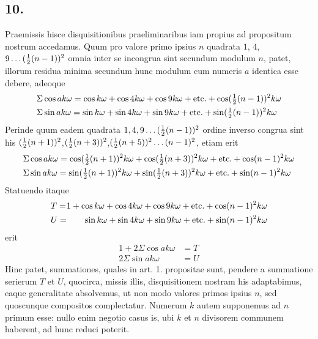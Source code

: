 \documentclass[twoside,12pt, showframe]{memoir}
\let\oldfrac\frac
\def\frac#1#2{\mathchoice{\tfrac{#1}{#2}}{\oldfrac{#1}{#2}}{\genfrac{}{}{}{2}{#1}{#2\mathstrut}}{\genfrac{}{}{}{3}{#1}{#2\mathstrut}}}
\begin{document}
\subsection*{10.}
 
Praemissis hisce disquisitionibus praeliminaribus iam propius ad propositum nostrum accedamus. Quum pro valore primo ipsius \(n\) quadrata \(1\), \( 4\), \( 9 \ldots(\frac{1}{2}(n-1))^{2}\) omnia inter se incongrua sint secundum modulum \(n\), patet, illorum residua minima secundum hunc modulum cum numeris \(a\) identica esse debere, adeoque
\[\begin{aligned}
& \Sigma \cos a k \omega=\cos k \omega+\cos 4 k \omega+\cos 9 k \omega+\text{etc.}+\cos (\frac{1}{2}(n-1))^{2} k \omega \\
& \Sigma \sin a k \omega=\sin k \omega+\sin 4 k \omega+\sin 9 k \omega+\text{etc.}+\sin (\frac{1}{2}(n-1))^{2} k \omega
\end{aligned}\]
Perinde quum eadem quadrata \(1,4,9 \ldots(\frac{1}{2}(n-1))^{2}\) ordine inverso congrua sint his \((\frac{1}{2}(n+1))^{2}\),\((\frac{1}{2}(n+3))^{2}\),\((\frac{1}{2}(n+5))^{2} \ldots(n-1)^{2}\), etiam erit\clearpage\noindent%
\[\begin{aligned}
& \Sigma \cos a k \omega=\cos (\frac{1}{2}(n+1))^{2} k \omega+\cos (\frac{1}{2}(n+3))^{2} k \omega+\text{etc.}+\cos (n-1)^{2} k \omega \\
& \Sigma \sin a k \omega=\sin (\frac{1}{2}(n+1))^{2} k \omega+\sin (\frac{1}{2}(n+3))^{2} k \omega+\text{etc.}+\sin (n-1)^{2} k \omega
\end{aligned}\]
Statuendo itaque
\[\begin{alignedat}[t]{2}
&T=&1+\cos k \omega+\cos 4 k \omega+\cos 9 k \omega+\text{etc.}+\cos (n-1)^{2} k \omega \\
& U= &\sin k \omega+\sin 4 k \omega+\sin 9 k \omega+\text{etc.}+\sin (n-1)^{2} k \omega
\end{alignedat}\]
erit
\[\begin{aligned}
1+2 \Sigma \cos a k \omega & =T \\
2 \Sigma \sin a k \omega & =U
\end{aligned}\]
Hinc patet, summationes, quales in art. 1. propositae sunt, pendere a summatione serierum \(T\) et \(U\), quocirca, missis illis, disquisitionem nostram his adaptabimus, eaque generalitate absolvemus, ut non modo valores primos ipsius \(n\), sed quoscunque compositos complectatur. Numerum \(k\) autem supponemus ad \(n\) primum esse: nullo enim negotio casus is, ubi \(k\) et \(n\) divisorem communem haberent, ad hunc reduci poterit.
\end{document}

